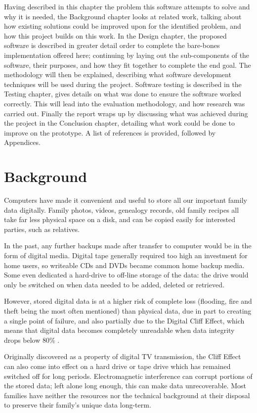 \documentclass[12pt,a4paper,]{adreport}
\begin{document}
Having described in this chapter the problem this software attempts to solve and why it is needed, the Background chapter looks at related work,
talking about how existing solutions could be improved upon for the
identified problem, and how this project builds on this work. In the
Design chapter, the proposed software is described in greater detail
order to complete the bare-bones implementation offered here; continuing
by laying out the sub-components of the software, their purposes, and
how they fit together to complete the end goal. The methodology will
then be explained, describing what software development techniques will
be used during the project. Software testing is described in the Testing chapter, gives details on what was done to ensure the software worked correctly. This will lead into the evaluation
methodology, and how research was carried out. Finally the report wraps up by discussing what was achieved during the project in the Conclusion chapter, detailing what work could be done to improve on the prototype. A list of references is provided, followed by Appendices.


\chapter{Background}\label{background}

Computers have made it convenient and useful to store all our important
family data digitally. Family photos, videos, genealogy records, old
family recipes all take far less physical space on a disk, and can be
copied easily for interested parties, such as relatives.

In the past, any further backups made after transfer to computer would
be in the form of digital media. Digital tape generally required too
high an investment for home users, so writeable CDs and DVDs became
common home backup media. Some even dedicated a hard-drive to off-line
storage of the data: the drive would only be switched on when data
needed to be added, deleted or retrieved.

However, stored digital data is at a higher risk of complete loss
(flooding, fire and theft being the most often mentioned) than physical
data, due in part to creating a single point of failure, and also
partially due to the Digital Cliff Effect, which means that digital data
becomes completely unreadable when data integrity drops below
80\% \cite{cliffEffect}.

Originally discovered as a property of digital TV transmission, the
Cliff Effect can also come into effect on a hard drive or tape drive
which has remained switched off for long periods. Electromagnetic
interference can corrupt portions of the stored data; left alone long
enough, this can make data unrecoverable. Most families have neither the
resources nor the technical background at their disposal to preserve
their family's unique data long-term.
\end{document}
